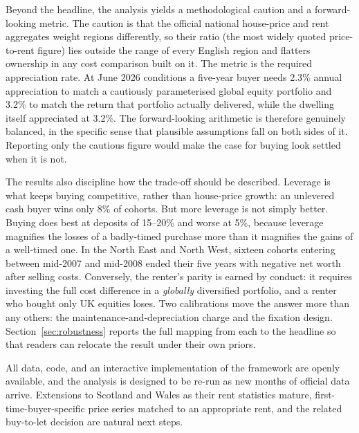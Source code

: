Beyond the headline, the analysis yields a methodological caution and a forward-looking metric. The caution is that the official national house-price and rent aggregates weight regions differently, so their ratio (the most widely quoted price-to-rent figure) lies outside the range of every English region and flatters ownership in any cost comparison built on it. The metric is the required appreciation rate. At June 2026 conditions a five-year buyer needs 2.3\% annual appreciation to match a cautiously parameterised global equity portfolio and 3.2\% to match the return that portfolio actually delivered, while the dwelling itself appreciated at 3.2\%. The forward-looking arithmetic is therefore genuinely balanced, in the specific sense that plausible assumptions fall on both sides of it. Reporting only the cautious figure would make the case for buying look settled when it is not.

The results also discipline how the trade-off should be described. Leverage is what keeps buying competitive, rather than house-price growth: an unlevered cash buyer wins only 8\% of cohorts. But more leverage is not simply better. Buying does best at deposits of 15--20\% and worse at 5\%, because leverage magnifies the losses of a badly-timed purchase more than it magnifies the gains of a well-timed one. In the North East and North West, sixteen cohorts entering between mid-2007 and mid-2008 ended their five years with negative net worth after selling costs. Conversely, the renter's parity is earned by conduct: it requires investing the full cost difference in a \emph{globally} diversified portfolio, and a renter who bought only UK equities loses. Two calibrations move the answer more than any others: the maintenance-and-depreciation charge and the fixation design. Section~\ref{sec:robustness} reports the full mapping from each to the headline so that readers can relocate the result under their own priors.

All data, code, and an interactive implementation of the framework are openly available, and the analysis is designed to be re-run as new months of official data arrive. Extensions to Scotland and Wales as their rent statistics mature, first-time-buyer-specific price series matched to an appropriate rent, and the related buy-to-let decision are natural next steps.
